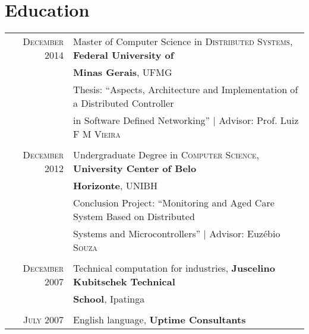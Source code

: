 \documentclass[a4paper,10pt]{article} %
\begin{document}
\section{Education}

\begin{tabular}{rl}	
\textsc{December} 2014 & Master of Computer Science in 
\textsc{Distributed Systems},  \textbf{Federal University of}
\\ & \textbf{Minas Gerais}, UFMG \\
& Thesis: ``Aspects, Architecture and Implementation of a Distributed
Controller \\ & in Software Defined Networking'' 
| \small Advisor: Prof. Luiz \textsc{F M Vieira} \\ 
&\\


\textsc{December} 2012& Undergraduate Degree in 
\textsc{}\textsc{Computer Science},
\normalsize\textbf{ University Center of Belo} 
\\ & \textbf{Horizonte}, UNIBH \\
& Conclusion Project: ``Monitoring and Aged Care System Based on 
Distributed
\\ & Systems and Microcontrollers'' 
| \small Advisor: Euzébio \textsc{Souza} \\
&\\


\textsc{December} 2007 &Technical computation for industries, 
\textbf{Juscelino Kubitschek Technical}
\\ & \textbf{School}, Ipatinga \\
&\\


\textsc{July} 2007 & English language, \textbf{Uptime Consultants}
\end{tabular}
\end{document}
